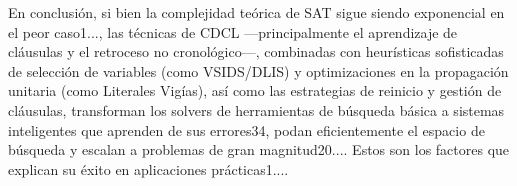En conclusión, si bien la complejidad teórica de SAT sigue siendo exponencial en el peor caso1..., las técnicas de CDCL —principalmente el aprendizaje de cláusulas y el retroceso no cronológico—, combinadas con heurísticas sofisticadas de selección de variables (como VSIDS/DLIS) y optimizaciones en la propagación unitaria (como Literales Vigías), así como las estrategias de reinicio y gestión de cláusulas, transforman los solvers de herramientas de búsqueda básica a sistemas inteligentes que aprenden de sus errores34, podan eficientemente el espacio de búsqueda y escalan a problemas de gran magnitud20.... Estos son los factores que explican su éxito en aplicaciones prácticas1....



